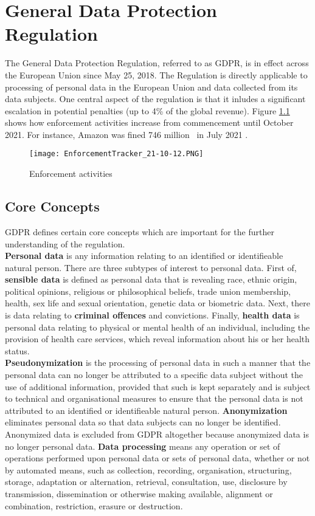 \documentclass[a4paper,12pt]{report}
\begin{document}
	\chapter{General Data Protection Regulation} 
	The General Data Protection Regulation, referred to as GDPR, is in effect across the European Union since May 25, 2018.
	The Regulation is directly applicable to processing of personal data in the European Union and data collected from its data subjects.
	One central aspect of the regulation is that it inludes a significant escalation in potential penalties (up to 4\% of the global revenue).
	Figure \ref{fig:enforcement_tracker} shows how enforcement activities increase from commencement until October 2021.
	For instance, Amazon was fined 746 million \texteuro \ in July 2021 \cite{EnforcementTracker}.
	\begin{figure}
		\centering
		\texttt{[image: EnforcementTracker\_21-10-12.PNG]}
		\caption{Enforcement activities \cite{EnforcementTracker}}
		\label{fig:enforcement_tracker}
	\end{figure}
	
	\section{Core Concepts}
	\startsection
	GDPR defines certain core concepts which are important for the further understanding of the regulation.\\
	\textbf{Personal data} is any information relating to an identified or identifieable natural person.
	There are three subtypes of interest to personal data. 
	First of, \textbf{sensible data} is defined as personal data that is revealing race, ethnic origin, political opinions, religious or philosophical beliefs, trade union membership, health, sex life and sexual orientation, genetic data or biometric data.
	Next, there is data relating to \textbf{criminal offences} and convictions.
	Finally, \textbf{health data} is personal data relating to physical or mental health of an individual, including the provision of health care services, which reveal information about his or her health status.\\
	\textbf{Pseudonymization} is the processing of personal data in such a manner that the personal data can no longer be attributed to a specific data subject without the use of additional information, provided that such is kept separately and is subject to technical and organisational measures to ensure that the personal data is not attributed to an identified or identifieable natural person.
	\textbf{Anonymization} eliminates personal data so that data subjects can no longer be identified. 
	Anonymized data is excluded from GDPR altogether because anonymized data is no longer personal data.
	\textbf{Data processing} means any operation or set of operations performed upon personal data or sets of personal data, whether or not by automated means, such as collection, recording, organisation, structuring, storage, adaptation or alternation, retrieval, consultation, use, disclosure by transmission, dissemination or otherwise making available, alignment or combination, restriction, erasure or destruction.
	\closesection
\end{document}
